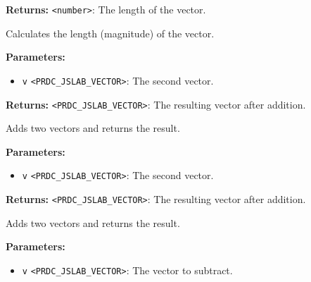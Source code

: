 \documentclass[12pt,a4paper]{article}
\begin{document}
\vspace{5mm}
\noindent {}


\noindent \textbf{Returns:} \texttt{<number>}: The length of the vector.

\noindent Calculates the length (magnitude) of the vector.

\vspace{5mm}
\noindent {}


\noindent \textbf{Parameters:}
\begin{itemize}
  \item \texttt{v} \texttt{<PRDC\_JSLAB\_VECTOR>}: The second vector.
\end{itemize}

\noindent \textbf{Returns:} \texttt{<PRDC\_JSLAB\_VECTOR>}: The resulting vector after addition.

\noindent Adds two vectors and returns the result.

\vspace{5mm}
\noindent {}


\noindent \textbf{Parameters:}
\begin{itemize}
  \item \texttt{v} \texttt{<PRDC\_JSLAB\_VECTOR>}: The second vector.
\end{itemize}

\noindent \textbf{Returns:} \texttt{<PRDC\_JSLAB\_VECTOR>}: The resulting vector after addition.

\noindent Adds two vectors and returns the result.

\vspace{5mm}
\noindent {}


\noindent \textbf{Parameters:}
\begin{itemize}
  \item \texttt{v} \texttt{<PRDC\_JSLAB\_VECTOR>}: The vector to subtract.
\end{itemize}
\end{document}
